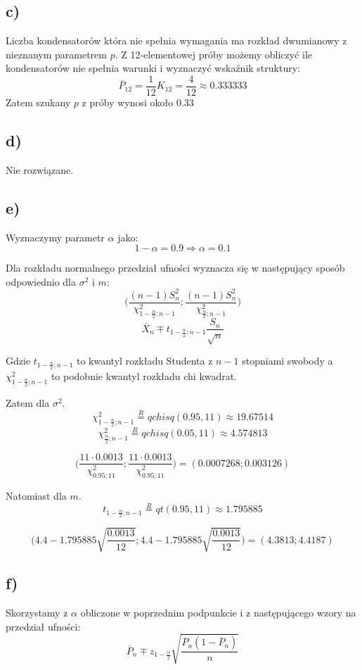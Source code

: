 \documentclass{article}
\begin{document}
\subsection{c)}
Liczba kondensatorów która nie spełnia wymagania ma rozkład dwumianowy z nieznanym parametrem $p$. Z 12-elementowej próby możemy obliczyć ile kondensatorów nie spełnia warunki i wyznaczyć wskaźnik struktury:
\[ \overline{P}_{12} = \frac{1}{12}K_12 = \frac{4}{12} \approx 0.333333 \]
Zatem szukany $p$ z próby wynosi około 0.33 

\subsection{d)}
Nie rozwiązane.

\subsection{e)}
Wyznaczymy parametr $\alpha$ jako:
\[ 1 - \alpha = 0.9 \Rightarrow \alpha = 0.1 \]

Dla rozkładu normalnego przedział ufności wyznacza się w następujący sposób odpowiednio dla $\sigma^2$ i $m$:
\[ \Big( \frac{(n-1)S_n^2}{\chi_{1-\frac{\alpha}{2}; n-1}^2} ; \frac{(n-1)S_n^2}{\chi_{\frac{\alpha}{2}; n-1}^2} \Big) \]
\[ \overline{X}_n \mp t_{1-\frac{\alpha}{2};n-1} \frac{S_n}{\sqrt{n}} \]

Gdzie $t_{1-\frac{\alpha}{2};n-1}$ to kwantyl rozkładu Studenta z $n-1$ stopniami swobody a $\chi_{1-\frac{\alpha}{2}; n-1}^2$ to podobnie kwantyl rozkładu chi kwadrat.

Zatem dla $\sigma^2$.
\[ \chi_{1-\frac{\alpha}{2}; n-1}^2 \overset{R}{=} qchisq(0.95, 11) \approx 19.67514 \]
\[ \chi_{\frac{\alpha}{2}; n-1}^2 \overset{R}{=} qchisq(0.05, 11) \approx 4.574813 \]

\[ \Big( \frac{11 \cdot 0.0013}{\chi_{0.95; 11}^2} ; \frac{11 \cdot 0.0013}{\chi_{0.95; 11}^2} \Big) = ( 0.0007268 ; 0.003126 ) \]

Natomiast dla $m$.
\[ t_{1-\frac{\alpha}{2};n-1} \overset{R}{=} qt(0.95, 11) \approx 1.795885 \]

\[ \Big( 4.4 -  1.795885 \sqrt{\frac{0.0013}{12}} ; 4.4 -  1.795885 \sqrt{\frac{0.0013}{12}} \Big) = ( 4.3813 ; 4.4187 ) \] 

\subsection{f)}
Skorzystamy z $\alpha$ obliczone w poprzednim podpunkcie i z następującego wzory na przedział ufności:
\[ \overline{P}_n \mp z_{1-\frac{\alpha}{2}} \sqrt{\frac{\overline{P}_n(1-\overline{P}_n) }{n}} \]
\end{document}
